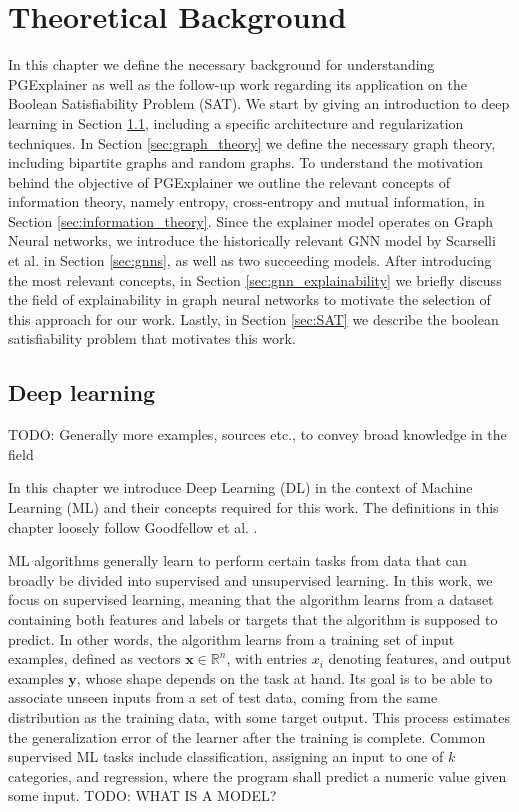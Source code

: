 \chapter{Theoretical Background}
\label{ch:Background}
In this chapter we define the necessary background for understanding PGExplainer as well as the follow-up work regarding its application on the Boolean Satisfiability Problem (SAT). We start by giving an introduction to deep learning in Section \ref{sec:deep_learning}, including a specific architecture and regularization techniques. In Section \ref{sec:graph_theory} we define the necessary graph theory, including bipartite graphs and random graphs. To understand the motivation behind the objective of PGExplainer we outline the relevant concepts of information theory, namely entropy, cross-entropy and mutual information, in Section \ref{sec:information_theory}. Since the explainer model operates on Graph Neural networks, we introduce the historically relevant GNN model by Scarselli et al. \cite{4700287} in Section \ref{sec:gnns}, as well as two succeeding models. After introducing the most relevant concepts, in Section \ref{sec:gnn_explainability} we briefly discuss the field of explainability in graph neural networks to motivate the selection of this approach for our work. Lastly, in Section \ref{sec:SAT} we describe the boolean satisfiability problem that motivates this work.

\section{Deep learning}
\label{sec:deep_learning}
TODO: Generally more examples, sources etc., to convey broad knowledge in the field

In this chapter we introduce Deep Learning (DL) in the context of Machine Learning (ML) and their concepts required for this work. The definitions in this chapter loosely follow Goodfellow et al. \cite{Goodfellow-et-al-2016}.

ML algorithms generally learn to perform certain tasks from data that can broadly be divided into supervised and unsupervised learning. In this work, we focus on supervised learning, meaning that the algorithm learns from a dataset containing both features and labels or targets that the algorithm is supposed to predict. In other words, the algorithm learns from a training set of input examples, defined as vectors $\mathbf{x} \in \mathbb{R}^n$, with entries $x_i$ denoting features, and output examples $\mathbf{y}$, whose shape depends on the task at hand. Its goal is to be able to associate unseen inputs from a set of test data, coming from the same distribution as the training data, with some target output. This process estimates the generalization error of the learner after the training is complete. 
Common supervised ML tasks include classification, assigning an input to one of $k$ categories, and regression, where the program shall predict a numeric value given some input. 
TODO: WHAT IS A MODEL?

